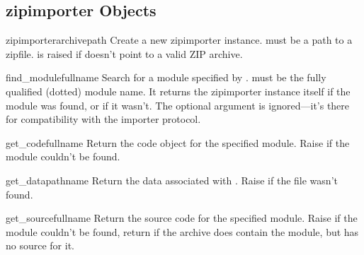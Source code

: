 \begin{seealso}


\end{seealso}


\subsection{zipimporter Objects \label{zipimporter-objects}}

\begin{classdesc}{zipimporter}{archivepath} 
  Create a new zipimporter instance.  must be a path to
  a zipfile.   is raised if 
  doesn't point to a valid ZIP archive.
\end{classdesc}

\begin{methoddesc}{find_module}{fullname}
  Search for a module specified by .  must be
  the fully qualified (dotted) module name. It returns the zipimporter
  instance itself if the module was found, or  if it wasn't.
  The optional  argument is ignored---it's there for 
  compatibility with the importer protocol.
\end{methoddesc}

\begin{methoddesc}{get_code}{fullname}
  Return the code object for the specified module. Raise
   if the module couldn't be found.
\end{methoddesc}

\begin{methoddesc}{get_data}{pathname}
  Return the data associated with . Raise 
  if the file wasn't found.
\end{methoddesc}

\begin{methoddesc}{get_source}{fullname}
  Return the source code for the specified module. Raise
   if the module couldn't be found, return
   if the archive does contain the module, but has
  no source for it.
\end{methoddesc}

